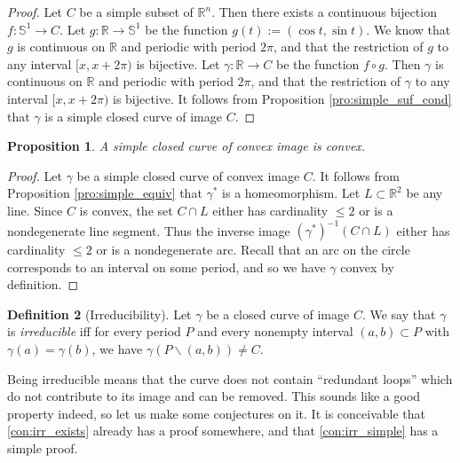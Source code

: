 \documentclass{amsart}
\newtheorem{proposition}{Proposition}[section]
\theoremstyle{definition}
\newtheorem{definition}[proposition]{Definition}
\theoremstyle{remark}
\begin{document}
\begin{proof}
    Let $C$ be a simple subset of $\mathbb{R}^n$.
    Then there exists a continuous bijection $f:\mathbb{S}^1\to C$.
    Let $g:\mathbb{R}\to\mathbb{S}^1$ be the function
    $g(t):=(\cos t,\sin t)$. We know that $g$ is continuous
    on $\mathbb{R}$ and periodic with period $2\pi$, and that
    the restriction of $g$ to any interval $[x,x+2\pi)$
    is bijective. Let $\gamma:\mathbb{R}\to C$ be the function
    $f\circ g$. Then $\gamma$ is continuous
    on $\mathbb{R}$ and periodic with period $2\pi$, and that the
    restriction of $\gamma$ to any interval $[x,x+2\pi)$ is bijective. It follows from Proposition \ref{pro:simple_suf_cond}
    that $\gamma$ is a simple closed curve of image $C$.
\end{proof}

\begin{proposition}
    \label{pro:simple_convex}
    A simple closed curve of convex image is convex.
\end{proposition}

\begin{proof}
    Let $\gamma$ be a simple closed curve of convex image $C$.
    It follows from Proposition \ref{pro:simple_equiv}
    that $\gamma^*$ is a homeomorphism.
    Let $L\subset\mathbb{R}^2$ be any line.
    Since $C$ is convex, the set $C\cap L$
    either has cardinality $\le2$ or is a nondegenerate line segment.
    Thus the inverse image $(\gamma^*)^{-1}(C\cap L)$
    either has cardinality $\le2$ or is a nondegenerate arc.
    Recall that an arc on the circle corresponds to an interval
    on some period, and so we have $\gamma$ convex by definition.
\end{proof}

\begin{definition}[Irreducibility]
    Let $\gamma$ be a closed curve of image $C$.
    We say that $\gamma$ is \emph{irreducible} iff for every period
    $P$ and every nonempty interval $(a,b)\subset P$
    with $\gamma(a)=\gamma(b)$, we have
    $\gamma(P\backslash(a,b))\ne C$.
\end{definition}

Being irreducible means that the curve does not contain
``redundant loops'' which do not contribute to its image
and can be removed.
This sounds like a good property indeed,
so let us make some conjectures on it.
It is conceivable that
\ref{con:irr_exists} already has a proof somewhere,
and that \ref{con:irr_simple} has a simple proof.
\end{document}
